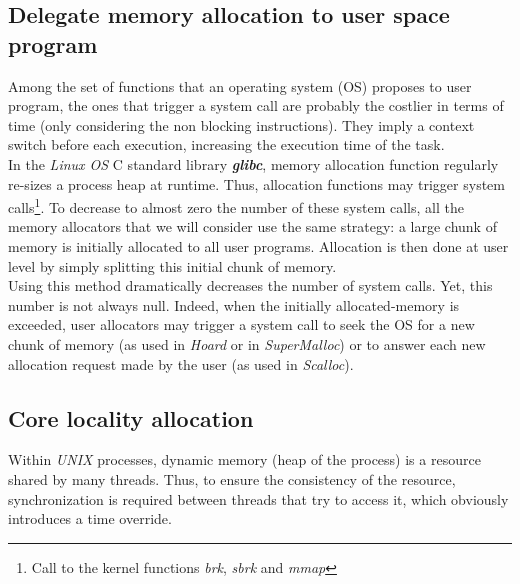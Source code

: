 \documentclass[10pt]{article}											%
\begin{document}

\subsection{Delegate memory allocation to user space program}
Among the set of functions that an operating system (OS) proposes to user program, the ones that trigger a system call are probably the costlier in terms of time (only considering the non blocking instructions).   They imply a context switch before each execution, increasing the execution time of the task.\\

In the \textit{Linux OS} C standard library \textbf{\textit{glibc}}\cite{glibc_robertson}, memory allocation function regularly re-sizes a process heap at runtime.  Thus, allocation functions may trigger system calls\footnote{Call to the kernel functions \textit{brk}, \textit{sbrk} and \textit{mmap}}.   To decrease to almost zero the number of these system calls, all the memory allocators that we will consider use the same strategy: a large chunk of memory is initially allocated to all user programs.   Allocation is then done at user level by simply splitting this initial chunk of memory.\\

Using this method dramatically decreases the number of system calls.  Yet, this number is not always null.  Indeed, when the initially allocated-memory is exceeded, user allocators may trigger a system call to seek the OS for a new chunk of memory (as used in \textit{Hoard}\cite{hoard_berger} or in \textit{SuperMalloc}\cite{supermalloc_kuszmaul}) or to answer each new allocation request made by the user (as used in \textit{Scalloc}\cite{scalloc_aigner}).



\subsection{Core locality allocation}
Within \textit{UNIX} processes, dynamic memory (heap of the process) is a resource shared by many threads.   Thus, to ensure the consistency of the resource, synchronization is required between threads that try to access it, which obviously introduces a time override.\\
\end{document}
